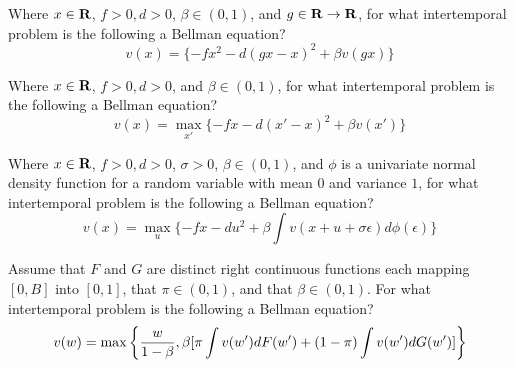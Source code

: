 \medskip
{} Where $x \in {\bf R}$, $f >0, d >0 $,   $\beta \in (0,1)$, and $g \in  {\bf R} \rightarrow {\bf R}$, for what intertemporal problem is the following  a Bellman equation?
$$ v(x) =  \{- f x^2 - d(gx  - x)^2 + \beta v(gx) \} $$


\medskip
{}   Where $x \in {\bf R}$, $f >0, d >0 $, and   $\beta \in (0,1)$, for what intertemporal problem is the following  a Bellman equation?
$$ v(x) = \max_{x'} \{ - f x - d(x' - x)^2 + \beta v(x') \} $$


\medskip
{} Where $x \in {\bf R}$, $f >0, d >0 $, $\sigma >0$,    $\beta \in (0,1)$, and $\phi$ is a univariate normal density function for a random
variable with mean $0$ and variance $1$, for what intertemporal problem is the following  a Bellman equation?
$$ v(x) = \max_{u} \{ - f x - d u^2 + \beta \int v(x +u + \sigma \epsilon) d \phi(\epsilon) \} $$



\medskip



  Assume that  $F$ and $G$ are distinct  right continuous functions each mapping $[0, B]$ into $[0,1]$, that $\pi \in (0,1)$, and  that $\beta \in (0,1)$. For what intertemporal problem is the following a Bellman equation?
$$ v(w) = \max\left\{ {w\over{1-\beta}},  \beta [  \pi \int v(w') d F(w') + (1-\pi) \int v(w') d G(w') ]  \right\} $$


\bye
